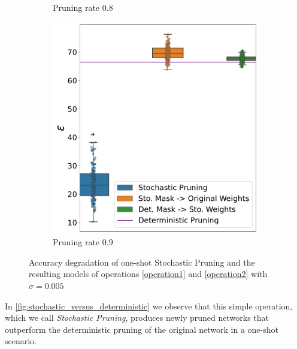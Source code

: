 \begin{figure}[!htb]
\begin{subfigure}[b]{0.65\columnwidth}
    \caption{Pruning rate 0.8} 
    \label{fig:pr0.8sigma0.005}
     \end{subfigure}
    \hfill
     \begin{subfigure}[b]{0.65\columnwidth}
         \centering
     \includegraphics[width=\columnwidth]{figures/epsilon_allN_all_pr_0.9_sigma=0.005.pdf}
    \caption{Pruning rate 0.9} 
    \label{fig:pr0.9sigma0.005}
     \end{subfigure}
     \caption{Accuracy degradation of one-shot Stochastic Pruning and the resulting models of operations \ref{operation1} and \ref{operation2} with $\sigma=0.005$}
     \label{fig:sigma0.005}
\end{figure}


In \cref{fig:stochastic_versus_deterministic} we observe that this simple operation, which we call \textit{Stochastic Pruning}, produces newly pruned networks that outperform the deterministic pruning of the original network in a one-shot scenario. 

